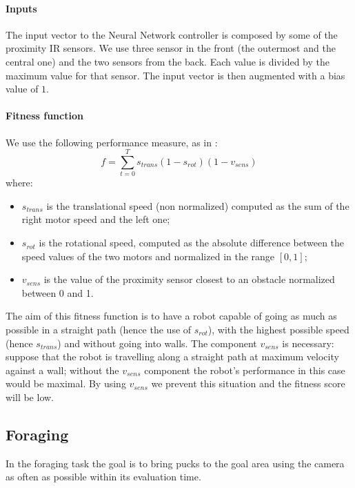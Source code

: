 \documentclass{article}
\begin{document}
	\paragraph{Inputs} %
	\label{par:obstacle_inputs}
	The input vector to the Neural Network controller is composed by some of
	the proximity IR sensors. We use three sensor in the front (the outermost
	and the central one) and the two sensors from the back. Each value is
	divided by the maximum value for that sensor. The input vector is
	then augmented with a bias value of $1$.

	\paragraph{Fitness function} %
	We use the following performance measure, as in \cite{heinermanevolution}:
	$$f = \sum_{t=0}^{T}{s_{trans} (1 - s_{rot}) (1 - v_{sens})}$$
	where:
	\begin{itemize}
		\item $s_{trans}$ is the translational speed (non normalized)
			computed as the sum of the right motor speed and the left one;
		\item $s_{rot}$ is the rotational speed, computed as the absolute
			difference between the speed values of the two motors and normalized
			in the range $[0, 1]$;
		\item $v_{sens}$ is the value of the proximity sensor closest to an
			obstacle normalized between 0 and 1.
	\end{itemize}
	The aim of this fitness function is to have a robot capable of going as much
	as possible in a straight path (hence the use of $s_{rot}$), with the
	highest possible speed (hence $s_{trans}$) and without going into walls. The
	component $v_{sens}$ is necessary: suppose that the robot is travelling
	along a straight path at maximum velocity against a wall; without the
	$v_{sens}$ component the robot's performance in this case would be maximal.
	By using $v_{sens}$ we prevent this situation and the fitness score will be
	low.

	\subsection{Foraging} %
	\label{sub:Foraging}
	In the foraging task the goal is to bring pucks to the goal area using the
	camera as often as possible within its evaluation time.
\end{document}
